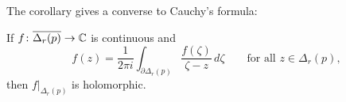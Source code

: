 \documentclass[10pt,aspectratio=169]{beamer}
\begin{document}
\begin{frame}
The corollary gives a converse to Cauchy's formula:

\medskip
\pause

If $f \colon \overline{\Delta_r(p)} \to {\mathbb{C}}$ is continuous and
\begin{equation*}
f(z) =
\frac{1}{2\pi i}
\int_{\partial \Delta_r(p)} \frac{f(\zeta)}{\zeta-z} \, d\zeta
\qquad \text{for all } z \in \Delta_r(p),
\end{equation*}
\pause
then $f|_{\Delta_r(p)}$ is holomorphic.

\end{frame}
\end{document}
